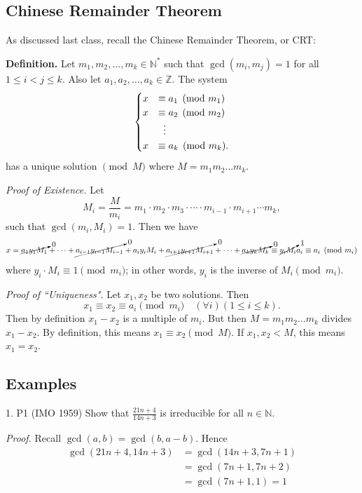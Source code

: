 \documentclass{article}
\begin{document}
\subsection*{Chinese Remainder Theorem}
    As discussed last class, recall the Chinese Remainder Theorem, or CRT: 
    
    \vspace{1.5mm}
    \textbf{Definition.} Let $m_{1}, m_{2}, \dots, m_{k} \in \mathbb{N}^{*}$ such that $\gcd(m_{i}, m_{j}) = 1$ for all $1 \le i < j \le k$. Also let $a_{1}, a_{2}, \dots, a_{k} \in \mathbb{Z}$. The system
    $$\begin{cases}
        x &\equiv a_{1} \pmod{m_{1}} \\
        x &\equiv a_{2} \pmod{m_{2}} \\
        &\vdotswithin{ = } \\
        x &\equiv a_{k} \pmod{m_{k}}.
    \end{cases}$$
    has a unique solution $\pmod{M}$ where $M = m_{1}m_{2}\dots m_{k}$.
    
    \vspace{1.5mm}
    \textit{Proof of Existence. } Let $$M_{i} = \frac{M}{m_{i}} = m_{1} \cdot m_{2} \cdot m_{3} \cdot \cdots \cdot m_{i - 1} \cdot m_{i + 1} \cdots m_{k},$$ such that $\gcd(m_{i}, M_{i}) = 1$.
    Then we have $$x = \cancelto{0}{a_{1}y_{1}M_{1}} + \dots + \cancelto{0}{a_{i - 1}y_{i - 1}M_{i - 1}} + a_{i}y_{i}M_{i} + \cancelto{0}{a_{i + 1}y_{i + 1}M_{i + 1}} + \cdots + \cancelto{0}{a_{k}y_{k}M_{k}} \equiv \cancelto{1}{y_{i}M_{i}}a_{i} \equiv a_{i} \pmod{m_{i}}$$ where $y_{i} \cdot M_{i} \equiv 1 \pmod{m_{i}}$; in other words, $y_{i}$ is the inverse of $M_{i} \pmod{m_{i}}$.
    
    \vspace{1.5mm}
    \textit{Proof of ``Uniqueness". } Let $x_{1}, x_{2}$ be two solutions. Then $$x_{1} \equiv x_{2} \equiv a_{i} \pmod{m_{i}} \quad (\forall i)(1 \le i \le k).$$ Then by definition $x_{1} - x_{2}$ is a multiple of $m_{i}$. But then $M = m_{1}m_{2}\dots m_{k}$ divides $x_{1} - x_{2}$. By definition, this means $x_{1} \equiv x_{2} \pmod{M}$. If $x_{1}, x_{2} < M$, this means $x_{1} = x_{2}$.

\subsection*{Examples}
    1. P1 (IMO 1959) Show that $\frac{21n + 4}{14n + 3}$ is irreducible for all $n \in \mathbb{N}$.
    
    \vspace{1.5mm}
    \textit{Proof. } Recall $\gcd(a, b) = \gcd(b, a - b)$. Hence 
    \begin{align*}
        \gcd(21n + 4, 14n + 3) &= \gcd(14n + 3, 7n + 1)\\
        &= \gcd(7n + 1, 7n + 2) \\
        &= \gcd(7n + 1, 1) = 1
    \end{align*}
    
\end{document}
